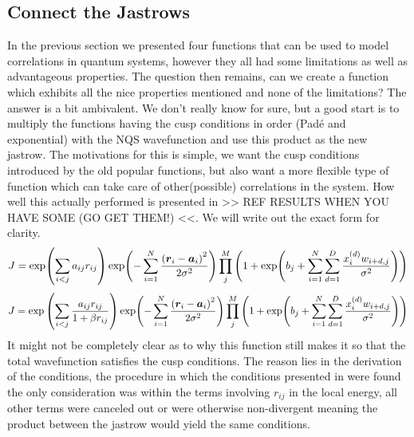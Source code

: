     \subsection{Connect the Jastrows}
        In the previous section we presented four functions that can be used to
        model correlations in quantum systems, however they all had some
        limitations as well as advantageous properties. The question then
        remains, can we create a function which exhibits all the nice
        properties mentioned and none of the limitations? The answer is a bit
        ambivalent. We don't really know for sure, but a good start is to
        multiply the functions having the cusp conditions in order (Pad\'e and
        exponential) with the NQS wavefunction and use this product as the new
        jastrow. The motivations for this is simple, we want the cusp
        conditions introduced by the old popular functions, but also want a
        more flexible type of function which can take care of other(possible)
        correlations in the system. How well this actually performed is
        presented in >> REF RESULTS WHEN YOU HAVE SOME (GO GET THEM!) <<. We
        will write out the exact form for clarity.
            \begin{equation}
                J = \exp(\sum\limits_{i<j}a_{ij} r_{ij})
                \exp(-\suml{i=1}{N} \frac{\left(\blds{r}_i -
                \blds{a}_i\right)^2}{2\sigma^2})\prod\limits^{M}_j \left(1 +
                \exp(b_j + \suml{i=1}{N}\suml{d=1}{D}
                \frac{x^{(d)}_iw_{i+d,j}}{\sigma^2})\right)
            \end{equation}
            \begin{equation}
                J = \exp\left(\sum\limits_{i<j}\frac{a_{ij} r_{ij}}{1 + \beta
                r_{ij}}\right) \exp(-\suml{i=1}{N} \frac{\left(\blds{r}_i -
                \blds{a}_i\right)^2}{2\sigma^2})\prod\limits^{M}_j \left(1 +
                \exp(b_j + \suml{i=1}{N}\suml{d=1}{D}
                \frac{x^{(d)}_iw_{i+d,j}}{\sigma^2})\right)
            \end{equation}
        It might not be completely clear as to why this function still makes it
        so that the total wavefunction satisfies the cusp conditions. The
        reason lies in the derivation of the conditions, the procedure in which
        the conditions presented in  were found the
        only consideration was within the terms involving $r_{ij}$ in the local
        energy, all other terms were canceled out or were otherwise
        non-divergent meaning the product between the jastrow would yield the
        same conditions.
